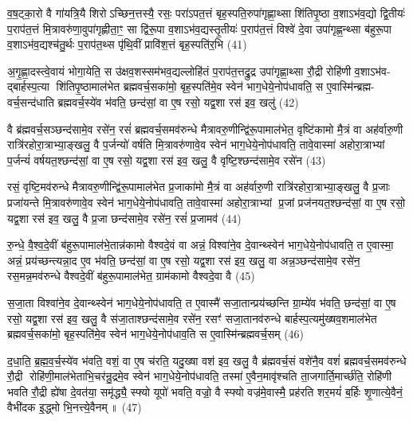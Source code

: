 {\anuvakamend[{अ॒स्मा॒ इन्द्र॑मे॒वैष स॑जा॒ता विश्वा॑ने॒व दे॒वान्थ्स्वेन॑ भाग॒धेये॒नोप॑धावति॒ त ए॒वास्मै प्राजाप॒त्यो हि त्रीणि॑ च॥ (6)॥}]}

व॒ष॒ट्का॒रो वै गा॑यत्रि॒यै शिरोऽच्छिन॒त्तस्यै॒ रसः॒ परा॑ऽपत॒त्तं बृह॒स्पति॒रुपा॑गृह्णा॒थ्सा शि॑तिपृ॒ष्ठा व॒शाऽभ॑व॒द्यो द्वि॒तीयः॑ प॒राप॑त॒त्तं मि॒त्रावरु॑णा॒वुपा॑गृह्णीता॒ꣳ॒ सा द्वि॑रू॒पा व॒शाऽभ॑व॒द्यस्तृ॒तीयः॑ प॒राप॑त॒त्तं विश्वे॑ दे॒वा उपा॑गृह्ण॒न्थ्सा ब॑हुरू॒पा व॒शाऽभ॑व॒द्यश्च॑तु॒र्थः प॒राप॑त॒थ्स पृ॑थि॒वीं प्रावि॑श॒त्तं बृह॒स्पति॑र॒भि (41)

अ॒गृ॒ह्णा॒दस्त्वे॒वायं भोगा॒येति॒ स उ॑क्षव॒शस्सम॑भव॒द्यल्लोहि॑तं प॒राप॑त॒त्तद्रु॒द्र उपा॑गृह्णा॒थ्सा रौ॒द्री रोहि॑णी व॒शाऽभ॑व- द्बार्\mbox{}हस्प॒त्या शि॑तिपृ॒ष्ठामाल॑भेत ब्रह्मवर्च॒सका॑मो॒ बृह॒स्पति॑मे॒व स्वेन॑ भाग॒धेये॒नोप॑धावति॒ स ए॒वास्मि॑न्ब्रह्म- वर्च॒सन्द॑धाति ब्रह्मवर्च॒स्ये॑व भ॑वति॒ छन्द॑सां॒ वा ए॒ष रसो॒ यद्व॒शा रस॑ इव॒ खलु॑ (42)

वै ब्र॑ह्मवर्च॒सञ्छन्द॑सामे॒व रसे॑न॒ रसं॑ ब्रह्मवर्च॒समव॑रुन्धे मैत्रावरु॒णीन्द्वि॑रू॒पामाल॑भेत॒ वृष्टि॑कामो मै॒त्रं वा अह॑र्वारु॒णी रात्रि॑रहोरा॒त्राभ्या॒ङ्खलु॒ वै प॒र्जन्यो॑ वर्\mbox{}षति मि॒त्रावरु॑णावे॒व स्वेन॑ भाग॒धेये॒नोप॑धावति॒ तावे॒वास्मा॑ अहोरा॒त्राभ्यां प॒र्जन्यं॑ वर्\mbox{}षयत॒श्छन्द॑सां॒ वा ए॒ष रसो॒ यद्व॒शा रस॑ इव॒ खलु॒ वै वृष्टि॒श्छन्द॑सामे॒व रसे॑न (43)

रसं॒ वृष्टि॒मव॑रुन्धे मैत्रावरु॒णीन्द्वि॑रू॒पामाल॑भेत प्र॒जाका॑मो मै॒त्रं वा अह॑र्वारु॒णी रात्रि॑रहोरा॒त्राभ्या॒ङ्खलु॒ वै प्र॒जाः प्रजा॑यन्ते मि॒त्रावरु॑णावे॒व स्वेन॑ भाग॒धेये॒नोप॑धावति॒ तावे॒वास्मा॑ अहोरा॒त्राभ्यां प्र॒जां प्रज॑नयत॒श्छन्द॑सां॒ वा ए॒ष रसो॒ यद्व॒शा रस॑ इव॒ खलु॒ वै प्र॒जा छन्द॑सामे॒व रसे॑न॒ रसं॑ प्र॒जामव॑ (44)

रु॒न्धे॒ वै॒श्व॒दे॒वीं ब॑हुरू॒पामाल॑भे॒तान्न॑कामो वैश्वदे॒वं वा अन्नं॒ विश्वा॑ने॒व दे॒वान्थ्स्वेन॑ भाग॒धेये॒नोप॑धावति॒ त ए॒वास्मा॒ अन्नं॒ प्रय॑च्छन्त्यन्ना॒द ए॒व भ॑वति॒ छन्द॑सां॒ वा ए॒ष रसो॒ यद्व॒शा रस॑ इव॒ खलु॒ वा अन्न॒ञ्छन्द॑सामे॒व रसे॑न॒ रस॒मन्न॒मव॑रुन्धे वैश्वदे॒वीं ब॑हुरू॒पामाल॑भेत॒ ग्राम॑कामो वैश्वदे॒वा वै (45)

स॒जा॒ता विश्वा॑ने॒व दे॒वान्थ्स्वेन॑ भाग॒धेये॒नोप॑धावति॒ त ए॒वास्मै॑ सजा॒तान्प्रय॑च्छन्ति ग्रा॒म्ये॑व भ॑वति॒ छन्द॑सां॒ वा ए॒ष रसो॒ यद्व॒शा रस॑ इव॒ खलु॒ वै स॑जा॒ताश्छन्द॑सामे॒व रसे॑न॒ रसꣳ॑ सजा॒तानव॑रुन्धे बार्\mbox{}हस्प॒त्यमु॑ख्षव॒शमाल॑भेत ब्रह्मवर्च॒सका॑मो॒ बृह॒स्पति॑मे॒व स्वेन॑ भाग॒धेये॒नोप॑धाव॒ति स ए॒वास्मि॑न्ब्रह्मवर्च॒सम् (46)

द॒धा॒ति॒ ब्र॒ह्म॒व॒र्च॒स्ये॑व भ॑वति॒ वशं॒ वा ए॒ष च॑रति॒ यदु॒ख्षा वश॑ इव॒ खलु॒ वै ब्र॑ह्मवर्च॒सं वशे॑नै॒व वशं॑ ब्रह्मवर्च॒समव॑रुन्धे रौ॒द्री रोहि॑णी॒माल॑भेताभि॒चर॑न्रु॒द्रमे॒व स्वेन॑ भाग॒धेये॒नोप॑धावति॒ तस्मा॑ ए॒वैन॒मावृ॑श्चति ता॒जगार्ति॒मार्च्छ॑ति॒ रोहि॑णी भवति रौ॒द्री ह्ये॑षा दे॒वत॑या॒ समृ॑द्ध्यै॒ स्फ्यो यूपो॑ भवति॒ वज्रो॒ वै स्फ्यो वज्र॑मे॒वास्मै॒ प्रह॑रति शर॒मयं॑ ब॒र्\mbox{}हिः शृ॒णात्ये॒वैनं॒ वैभी॑दक इ॒द्ध्मो भि॒नत्त्ये॒वैनम्॥ (47)

